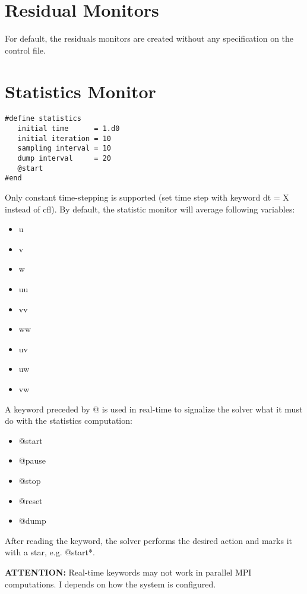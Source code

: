 \documentclass[a4paper,10pt]{report}
\begin{document}
\section{Residual Monitors}
For default, the residuals monitors are created without any specification on the control file.

\section{Statistics Monitor}
\begin{lstlisting}
#define statistics
   initial time      = 1.d0
   initial iteration = 10
   sampling interval = 10
   dump interval     = 20
   @start
#end
\end{lstlisting}

Only constant time-stepping is supported (set time step with keyword dt = X instead of cfl).
By default, the statistic monitor will average following variables:

\begin{multicols}{3}
\begin{itemize}
\item u
\item v
\item w
\item uu 
\item vv 
\item ww 
\item uv 
\item uw 
\item vw 
\end{itemize}
\end{multicols}

A keyword preceded by @ is used in real-time to signalize the solver what it must do with the statistics computation:

\begin{multicols}{3}
\begin{itemize}
\item @start
\item @pause
\item @stop
\item @reset
\item @dump
\end{itemize}
\end{multicols}

After reading the keyword, the solver performs the desired action and marks it with a star, e.g. @start*.

\textbf{ATTENTION:} Real-time keywords may not work in parallel MPI computations. I depends on how the system is configured.
\end{document}

